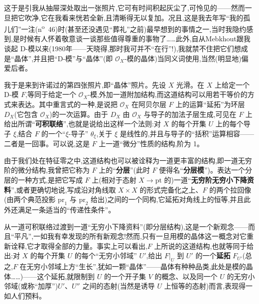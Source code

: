 \noindent 这于是引我从抽屉深处取出一张照片,它可有时间积起灰尘了,可怜见的——然而一旦把它吹净,它在我看来恍若全新,且清晰得无以复加。况且,这是我去年写“我的孤儿们”一注(n\textsuperscript{o}~46)时(甚至还没遇见“葬礼”之前)最早想到的事情之一,当时我隐约感到,是时候有人怀着敬意谈一谈那些值得尊重的事物了……此外,自从Mebkhout\dmark{}跟我谈起 D-模以来(1980年——天晓得,那时我可并不“在行”!),我就禁不住把它们想成是“晶体”,并且把“D-模”与“晶体”(即 $\mathcal{O}_{X}$-模的晶体)当同义词使用,当然(明显地)偏爱后者。

\noindent 我于是来到许诺过的第四张照片,即“晶体”照片。先设 $X$ 光滑。在 $X$ 上给定一个 D-模 $F$,等同于给定一个 $\mathcal{O}_{X}$-模,外加一道附加结构,而这道结构可以用若干等价的方式来表达。其中重言式的一种,是说把 $\mathcal{O}_{X}$ 在阿贝尔层 $F$ 上的运算“延拓”为环层 $D_{X}$(它包含 $\mathcal{O}_{X}$)的一次运算。由于 $D_{X}$ 由 $\mathcal{O}_{X}$ 与导子的加法子层生成,可见在 $F$ 上给出所谓“\textbf{可积联络}”,也就是说给出这样一个法则:对 $X$ 的每个开集 $U$ 上的每个导子 $\xi$,结合 $F$ 的一个“$\xi$-导子” $\theta_{\xi}$,关于 $\xi$ 是线性的,并且与导子的“括积”运算相容——二者是一回事。可以说,这是 $F$ 上一道“微分”性质的结构,阶为 1。

\noindent 由于我们处在特征零之中,这道结构也可以被诠释为一道更丰富的结构,即一道无穷阶的微分结构,我曾把它称为 $F$ 上的“\textbf{分层}”(此时 $F$ 便得名“\textbf{分层模}”)。表达一个分层的一种方式,是把它写成 $F$ 上(相对于态射 $X\to\mathrm{pt}$ 的)一道“\textbf{无穷阶无穷小下降资料}”,或者更确切地说,写成\dmark{}沿对角线取 $X\times X$ 的形式完备化之上、$F$ 的两个拉回像(由两个典范投影 $\mathrm{pr}_{1}$ 与 $\mathrm{pr}_{2}$ 给出)之间的一个同构,它延拓对角线上的恒等,并且此外还满足一条适当的“传递性条件”。

\noindent 从一道可积联络过渡到一道“无穷小下降资料”(即分层结构),这是一个新观念——而且“平凡”,一如我有幸发现的所有新观念!然而,只有一旦用模的晶体这一概念对它重新诠释,它才取得全部的力量。事实上可以看出,$F$ 上所说的这道结构,也就等同于给出:对 $X$ 的每个开集 $U$ 的每个“无穷小邻域” $U'$,给出 $F|_{U}$ 到 $U'$ 的一个\textbf{延拓} $F_{U'}$(总之,$F$ 在无穷小邻域上方“生长”,犹如一颗“晶体”——晶体有种种品类,此处是模的晶体……)——这个延拓,就限制到 $U$ 的一个开子集 $V$ 的概念、以及同一个 $U$ 的无穷小邻域(或称“加厚”)$U'$、$U''$ 之间的态射(当然是诱导 $U$ 上恒等的态射)而言,表现得一如人们预料。

